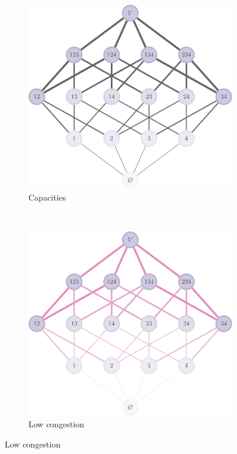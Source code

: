 \begin{figure}[tbp]
\begin{subfigure}[b]{\subflen}
    \includegraphics[width=\textwidth]{figures/gibbs/cp_easy.pdf}
    \caption{Capacities}
    \label{fig:cong2}
  \end{subfigure}\\[2em]
  \begin{subfigure}[b]{\subflen}
    \centering
    \includegraphics[width=\textwidth]{figures/gibbs/cp_easy_cong.pdf}
    \caption{Low congestion}

\end{subfigure}
\end{figure}
